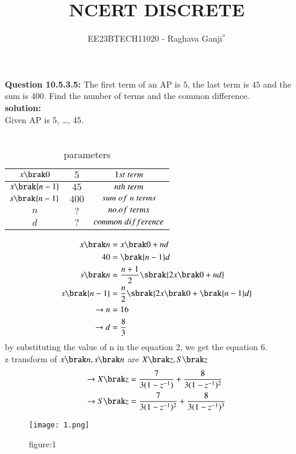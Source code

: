 \documentclass[journal,12pt,twocolumn]{IEEEtran}
\theoremstyle{remark}
\begin{document}

\vspace{3cm}

\title{NCERT DISCRETE}
\author{EE23BTECH11020 - Raghava Ganji$^{*}$%
}
\maketitle
\newpage
\bigskip

\renewcommand{\thefigure}{\theenumi}
\renewcommand{\thetable}{\theenumi}

\textbf{Question 10.5.3.5:}
The first term of an AP is $5$, the last term is $45$ and the sum is $400$. Find the number of terms and the common difference.\\
\textbf{solution:}\\
Given AP is 5, \ldots, 45.\\\\
\begin{table}[h]
\centering
\begin{tabular}{|c|c|c|}\hline
$x\brak 0$ & $5$ & $ 1st\hspace{1mm}term$\\ \hline
$x\brak {n-1}$ & $45$ & $nth\hspace{1mm}term$\\ \hline
$s\brak {n-1}$ & $400$ & $sum\hspace{1mm}of\hspace{1mm}n\hspace{1mm}terms$\\ \hline
$n$ & $?$ & $no.of\hspace{1mm}terms$\\ \hline
$d$ & $?$ & $common\hspace{1mm}difference$\\ \hline
\end{tabular}
\caption{parameters}
\end{table}
\begin{align}
x\brak n&=x\brak 0+nd\\
40&=\brak {n-1}d\\
s\brak n&=\frac{n+1}{2} \sbrak {2x\brak 0+nd}\\
s\brak {n-1}&=\frac{n}{2} \sbrak {2x\brak 0+\brak {n-1}d}\\
\rightarrow n&=16\\
\rightarrow d&=\frac{8}{3}
\end{align}
by substituting the value of n in the equation 2, we get the equation 6.\\
z transform of $x\brak n,s\brak n$ are $X\brak z,S\brak z$
\begin{align}
\rightarrow X\brak z&=\frac{7}{3(1-z^{-1})}+\frac{8}{3(1-z^{-1})^2}\\
\rightarrow S\brak z&=\frac{7}{3(1-z^{-1})^2}+\frac{8}{3(1-z^{-1})^3}
\end{align}
\begin{figure}
    \centering
    \texttt{[image: 1.png]}
    \caption{figure:1}
\end{figure}
\end{document}
